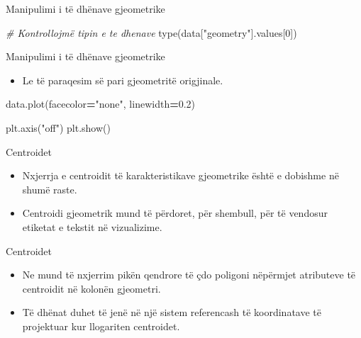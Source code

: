 \documentclass[
  ignorenonframetext,
]{beamer}
\newenvironment{Shaded}{\begin{snugshade}}{\end{snugshade}}
\newcommand{\BuiltInTok}[1]{#1}
\newcommand{\CommentTok}[1]{\textcolor[rgb]{0.56,0.35,0.01}{\textit{#1}}}
\newcommand{\DecValTok}[1]{\textcolor[rgb]{0.00,0.00,0.81}{#1}}
\newcommand{\FloatTok}[1]{\textcolor[rgb]{0.00,0.00,0.81}{#1}}
\newcommand{\NormalTok}[1]{#1}
\newcommand{\OperatorTok}[1]{\textcolor[rgb]{0.81,0.36,0.00}{\textbf{#1}}}
\newcommand{\StringTok}[1]{\textcolor[rgb]{0.31,0.60,0.02}{#1}}
\providecommand{\tightlist}{%
  \setlength{\itemsep}{0pt}\setlength{\parskip}{0pt}}
\begin{document}
\begin{frame}[fragile]{Manipulimi i të dhënave gjeometrike}
\protect\hypertarget{manipulimi-i-tuxeb-dhuxebnave-gjeometrike-8}{}

\begin{Shaded}
\begin{Highlighting}[]
\CommentTok{\# Kontrollojmë tipin e te dhenave}
\BuiltInTok{type}\NormalTok{(data[}\StringTok{"geometry"}\NormalTok{].values[}\DecValTok{0}\NormalTok{])}
\end{Highlighting}
\end{Shaded}
\end{frame}

\begin{frame}[fragile]{Manipulimi i të dhënave gjeometrike}
\protect\hypertarget{manipulimi-i-tuxeb-dhuxebnave-gjeometrike-9}{}
\begin{itemize}
\tightlist
\item
  Le të paraqesim së pari gjeometritë origjinale.
\end{itemize}


\begin{Shaded}
\begin{Highlighting}[]
\NormalTok{data.plot(facecolor}\OperatorTok{=}\StringTok{"none"}\NormalTok{, linewidth}\OperatorTok{=}\FloatTok{0.2}\NormalTok{)}

\NormalTok{plt.axis(}\StringTok{"off"}\NormalTok{)}
\NormalTok{plt.show()}
\end{Highlighting}
\end{Shaded}
\end{frame}

\begin{frame}{Centroidet}
\protect\hypertarget{centroidet}{}
\begin{itemize}
\item
  Nxjerrja e centroidit të karakteristikave gjeometrike është e dobishme
  në shumë raste.
\item
  Centroidi gjeometrik mund të përdoret, për shembull, për të vendosur
  etiketat e tekstit në vizualizime.
\end{itemize}
\end{frame}

\begin{frame}{Centroidet}
\protect\hypertarget{centroidet-1}{}
\begin{itemize}
\item
  Ne mund të nxjerrim pikën qendrore të çdo poligoni nëpërmjet
  atributeve të centroidit në kolonën gjeometri.
\item
  Të dhënat duhet të jenë në një sistem referencash të koordinatave të
  projektuar kur llogariten centroidet.
\end{itemize}
\end{frame}
\end{document}
